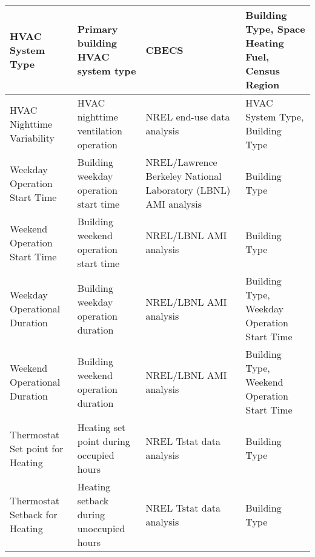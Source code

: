 \begin{center}
\begin{longtable}{|p{1.3in}|p{1.5in}|p{1.5in}|p{1.5in}|}
HVAC System Type                                                & Primary building HVAC system type                                              & CBECS                                                       & Building Type, Space Heating Fuel, Census Region                                                     \\ \hline
HVAC Nighttime Variability                                      & HVAC nighttime ventilation operation                                           & NREL end-use data analysis                                  & HVAC System Type, Building Type                                                                      \\ \hline
Weekday Operation Start Time                                    & Building weekday operation start time                                          & NREL/Lawrence Berkeley National Laboratory (LBNL) AMI analysis                                      & Building Type                                                                                        \\ \hline
Weekend Operation Start Time                                    & Building weekend operation start time                                          & NREL/LBNL AMI analysis                                      & Building Type                                                                                        \\ \hline
Weekday Operational Duration                                    & Building weekday operation duration                                            & NREL/LBNL AMI analysis                                      & Building Type, Weekday Operation Start Time                                                          \\ \hline
Weekend Operational Duration                                    & Building weekend operation duration                                            & NREL/LBNL AMI analysis                                      & Building Type, Weekend Operation Start Time                                                          \\ \hline
Thermostat Set point for Heating                                 & Heating set point during occupied hours                                         & NREL Tstat data analysis                                    & Building Type                                                                                        \\ \hline
Thermostat Setback for Heating                                  & Heating setback during unoccupied hours                                        & NREL Tstat data analysis                                    & Building Type                                                                                        \\ \hline

\end{longtable}
\end{center}
